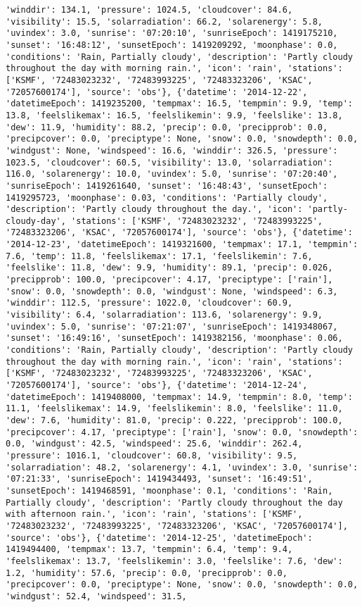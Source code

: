 \documentclass[
  letterpaper,
  DIV=11,
  numbers=noendperiod]{scrartcl}
\begin{document}
\begin{verbatim}
'winddir': 134.1, 'pressure': 1024.5, 'cloudcover': 84.6, 'visibility': 15.5, 'solarradiation': 66.2, 'solarenergy': 5.8, 'uvindex': 3.0, 'sunrise': '07:20:10', 'sunriseEpoch': 1419175210, 'sunset': '16:48:12', 'sunsetEpoch': 1419209292, 'moonphase': 0.0, 'conditions': 'Rain, Partially cloudy', 'description': 'Partly cloudy throughout the day with morning rain.', 'icon': 'rain', 'stations': ['KSMF', '72483023232', '72483993225', '72483323206', 'KSAC', '72057600174'], 'source': 'obs'}, {'datetime': '2014-12-22', 'datetimeEpoch': 1419235200, 'tempmax': 16.5, 'tempmin': 9.9, 'temp': 13.8, 'feelslikemax': 16.5, 'feelslikemin': 9.9, 'feelslike': 13.8, 'dew': 11.9, 'humidity': 88.2, 'precip': 0.0, 'precipprob': 0.0, 'precipcover': 0.0, 'preciptype': None, 'snow': 0.0, 'snowdepth': 0.0, 'windgust': None, 'windspeed': 16.6, 'winddir': 326.5, 'pressure': 1023.5, 'cloudcover': 60.5, 'visibility': 13.0, 'solarradiation': 116.0, 'solarenergy': 10.0, 'uvindex': 5.0, 'sunrise': '07:20:40', 'sunriseEpoch': 1419261640, 'sunset': '16:48:43', 'sunsetEpoch': 1419295723, 'moonphase': 0.03, 'conditions': 'Partially cloudy', 'description': 'Partly cloudy throughout the day.', 'icon': 'partly-cloudy-day', 'stations': ['KSMF', '72483023232', '72483993225', '72483323206', 'KSAC', '72057600174'], 'source': 'obs'}, {'datetime': '2014-12-23', 'datetimeEpoch': 1419321600, 'tempmax': 17.1, 'tempmin': 7.6, 'temp': 11.8, 'feelslikemax': 17.1, 'feelslikemin': 7.6, 'feelslike': 11.8, 'dew': 9.9, 'humidity': 89.1, 'precip': 0.026, 'precipprob': 100.0, 'precipcover': 4.17, 'preciptype': ['rain'], 'snow': 0.0, 'snowdepth': 0.0, 'windgust': None, 'windspeed': 6.3, 'winddir': 112.5, 'pressure': 1022.0, 'cloudcover': 60.9, 'visibility': 6.4, 'solarradiation': 113.6, 'solarenergy': 9.9, 'uvindex': 5.0, 'sunrise': '07:21:07', 'sunriseEpoch': 1419348067, 'sunset': '16:49:16', 'sunsetEpoch': 1419382156, 'moonphase': 0.06, 'conditions': 'Rain, Partially cloudy', 'description': 'Partly cloudy throughout the day with morning rain.', 'icon': 'rain', 'stations': ['KSMF', '72483023232', '72483993225', '72483323206', 'KSAC', '72057600174'], 'source': 'obs'}, {'datetime': '2014-12-24', 'datetimeEpoch': 1419408000, 'tempmax': 14.9, 'tempmin': 8.0, 'temp': 11.1, 'feelslikemax': 14.9, 'feelslikemin': 8.0, 'feelslike': 11.0, 'dew': 7.6, 'humidity': 81.0, 'precip': 0.222, 'precipprob': 100.0, 'precipcover': 4.17, 'preciptype': ['rain'], 'snow': 0.0, 'snowdepth': 0.0, 'windgust': 42.5, 'windspeed': 25.6, 'winddir': 262.4, 'pressure': 1016.1, 'cloudcover': 60.8, 'visibility': 9.5, 'solarradiation': 48.2, 'solarenergy': 4.1, 'uvindex': 3.0, 'sunrise': '07:21:33', 'sunriseEpoch': 1419434493, 'sunset': '16:49:51', 'sunsetEpoch': 1419468591, 'moonphase': 0.1, 'conditions': 'Rain, Partially cloudy', 'description': 'Partly cloudy throughout the day with afternoon rain.', 'icon': 'rain', 'stations': ['KSMF', '72483023232', '72483993225', '72483323206', 'KSAC', '72057600174'], 'source': 'obs'}, {'datetime': '2014-12-25', 'datetimeEpoch': 1419494400, 'tempmax': 13.7, 'tempmin': 6.4, 'temp': 9.4, 'feelslikemax': 13.7, 'feelslikemin': 3.0, 'feelslike': 7.6, 'dew': 1.2, 'humidity': 57.6, 'precip': 0.0, 'precipprob': 0.0, 'precipcover': 0.0, 'preciptype': None, 'snow': 0.0, 'snowdepth': 0.0, 'windgust': 52.4, 'windspeed': 31.5, 
\end{verbatim}
\end{document}
